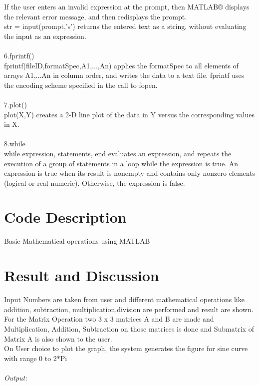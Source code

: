 \documentclass[12pt]{article}
\begin{document}
If the user enters an invalid expression at the prompt, then MATLAB® displays the relevant error message, and then redisplays the prompt.\\
str = input(prompt,'s') returns the entered text as a string, without evaluating the input as an expression.\\\\
6.fprintf()\\
fprintf(fileID,formatSpec,A1,...,An) applies the formatSpec to all elements of arrays A1,...An in column order, and writes the data to a text file. fprintf uses the encoding scheme specified in the call to fopen.\\\\
7.plot()\\
plot(X,Y) creates a 2-D line plot of the data in Y versus the corresponding values in X.\\\\
8.while\\
while expression, statements, end evaluates an expression, and repeats the execution of a group of statements in a loop while the expression is true. An expression is true when its result is nonempty and contains only nonzero elements (logical or real numeric). Otherwise, the expression is false.\\
\pagebreak

\section{Code Description}
Basic Mathematical operations using MATLAB\\






\pagebreak

\section{Result and Discussion}
Input Numbers are taken from user and different mathematical operations like addition, subtraction, multiplication,division are performed and result are shown. For the Matrix Operation two 3 x 3  matrices A and B are made and Multiplication, Addition, Subtraction on those matrices is done and Submatrix of Matrix A is also shown to the user.\\
On User choice to plot the graph, the system generates the figure for sine curve with range 0 to 2*Pi\\\\
\emph{Output:}\\
\end{document}
